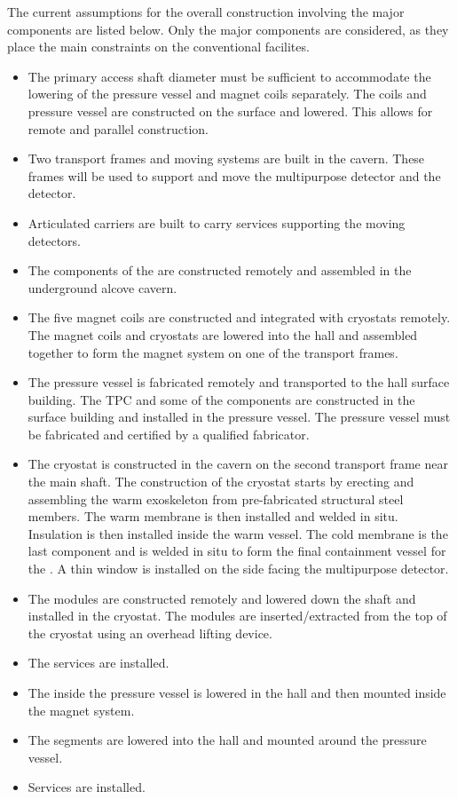 The current assumptions for the overall construction involving the major components are listed below.  Only the major components are considered, as they place the main constraints on the conventional facilites.
\begin{itemize}
    \item The primary access shaft diameter must be sufficient to  accommodate the lowering of the pressure vessel and magnet coils separately. The coils and pressure vessel are constructed on the surface and lowered. This allows for remote and parallel construction.
    \item Two transport frames and moving systems are built in the cavern.  These frames will be used to support and move the multipurpose detector and the  detector.
    \item Articulated carriers are built to carry services supporting the moving detectors.
    \item The components of the  are constructed remotely and assembled in the underground alcove cavern.  
    \item The five magnet coils are constructed and integrated with cryostats remotely.  The magnet coils and cryostats are lowered into the   hall and assembled together to form the magnet system on one of the transport frames.
    \item The pressure vessel is fabricated remotely and transported to the   hall surface building.  The TPC and some of the  components are constructed in the surface building and installed in the pressure vessel.  The pressure vessel must be fabricated and certified by a qualified fabricator.
    \item The  cryostat is constructed in the cavern on the second transport frame near the main shaft.  The construction of the cryostat starts by erecting and assembling the warm exoskeleton from pre-fabricated structural steel members. The warm membrane is then installed and welded in situ. Insulation is then installed inside the warm vessel. The cold membrane is the last component and is welded in situ to form the final containment vessel for the . A thin window is installed on the side facing the multipurpose detector. 
    \item The  modules are constructed remotely and lowered down the shaft and installed in the cryostat. The modules are inserted/extracted from the  top of the cryostat using an overhead lifting device. 
    \item The  services are installed.
    \item The  inside the pressure vessel is lowered in the hall and then mounted inside the magnet system. 
    \item The  segments are lowered into the hall and mounted around the pressure vessel. 
    \item  Services are installed.
\end{itemize}
